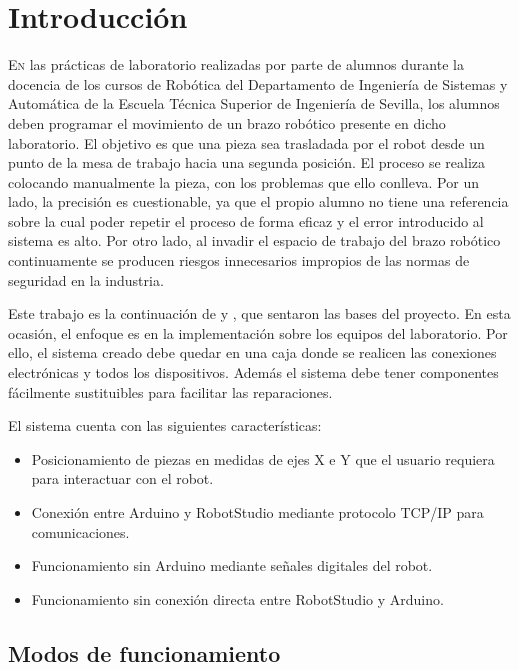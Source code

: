 \chapter{Introducción}\label{chp-01}


\lettrine[lraise=-0.1, lines=2, loversize=0.2]{E}{n} las prácticas de laboratorio realizadas
por parte de alumnos durante la docencia de los cursos de Robótica del Departamento de Ingeniería
de Sistemas y Automática de la Escuela Técnica Superior de Ingeniería de Sevilla, los alumnos
deben programar el movimiento de un brazo robótico presente en dicho laboratorio. El objetivo
es que una pieza sea trasladada por el robot desde un punto de la mesa de trabajo hacia una
segunda posición. El proceso se realiza colocando manualmente la pieza, con los problemas que
ello conlleva. Por un lado, la precisión es cuestionable, ya que el propio alumno no tiene una
referencia sobre la cual poder repetir el proceso de forma eficaz y el error introducido al sistema
es alto. Por otro lado, al invadir el espacio de trabajo del brazo robótico continuamente se
producen riesgos innecesarios impropios de las normas de seguridad en la industria.

Este trabajo es la continuación de \cite{tapia} y \cite{rea}, que sentaron las bases del proyecto.
En esta ocasión, el enfoque es en la implementación sobre los equipos del laboratorio. Por ello,
el sistema creado debe quedar en una caja donde se realicen las conexiones electrónicas y todos
los dispositivos. Además el sistema debe tener componentes fácilmente sustituibles para facilitar
las reparaciones.

El sistema cuenta con las siguientes características:
\begin{itemize}
	\item Posicionamiento de piezas en medidas de ejes X e Y que el usuario requiera para 
	interactuar con el robot.
	\item Conexión entre Arduino y RobotStudio mediante protocolo TCP/IP para comunicaciones.
	\item Funcionamiento sin Arduino mediante señales digitales del robot.
	\item Funcionamiento sin conexión directa entre RobotStudio y Arduino.
\end{itemize}

\section{Modos de funcionamiento}\label{sec-00}

